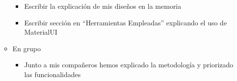 \begin{itemize}
\begin{itemize}
\begin{itemize}
                        \item Escribir la explicación de mis diseños en la memoria
                        \item Escribir sección en “Herramientas Empleadas” explicando el uso de MaterialUI
                    \end{itemize}
              \item En grupo
                    \begin{itemize}
                        \item Junto a mis compañeros hemos explicado la metodología y priorizado las funcionalidades
                    \end{itemize}
          \end{itemize}
\end{itemize}

